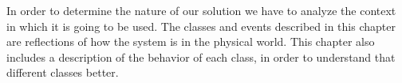 In order to determine the nature of our solution we have to analyze the context in which it is going to be used.
The classes and events described in this chapter are reflections of how the system is in the physical world.
This chapter also includes a description of the behavior of each class, in order to understand that different classes better.







